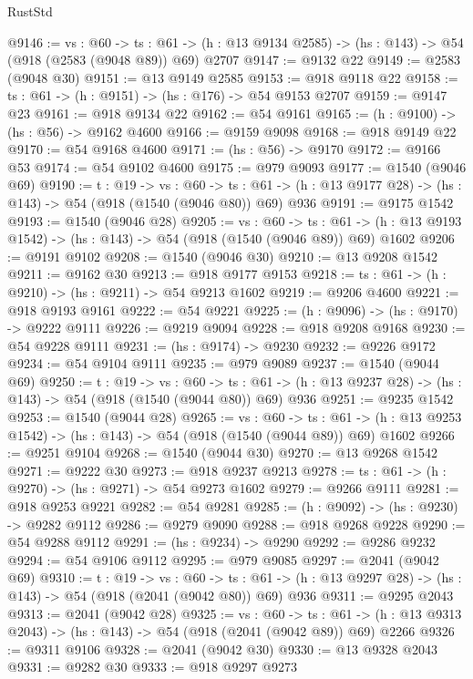 \begin{lexlean}{RustStd}
\begin{coremodule}
@9146 := {vs : @60} ->
  {ts : @61} -> (h : @13 @9134 @2585) -> (hs : @143) -> @54 (@918 (@2583 (@9048 @89)) @69) @2707
@9147 := @9132 @22
@9149 := @2583 (@9048 @30)
@9151 := @13 @9149 @2585
@9153 := @918 @9118 @22
@9158 := {ts : @61} -> (h : @9151) -> (hs : @176) -> @54 @9153 @2707
@9159 := @9147 @23
@9161 := @918 @9134 @22
@9162 := @54 @9161
@9165 := (h : @9100) -> (hs : @56) -> @9162 @4600
@9166 := @9159 @9098
@9168 := @918 @9149 @22
@9170 := @54 @9168 @4600
@9171 := (hs : @56) -> @9170
@9172 := @9166 @53
@9174 := @54 @9102 @4600
@9175 := @979 @9093
@9177 := @1540 (@9046 @69)
@9190 := {t : @19} ->
  {vs : @60} ->
  {ts : @61} -> (h : @13 @9177 @28) -> (hs : @143) -> @54 (@918 (@1540 (@9046 @80)) @69) @936
@9191 := @9175 @1542
@9193 := @1540 (@9046 @28)
@9205 := {vs : @60} ->
  {ts : @61} -> (h : @13 @9193 @1542) -> (hs : @143) -> @54 (@918 (@1540 (@9046 @89)) @69) @1602
@9206 := @9191 @9102
@9208 := @1540 (@9046 @30)
@9210 := @13 @9208 @1542
@9211 := @9162 @30
@9213 := @918 @9177 @9153
@9218 := {ts : @61} -> (h : @9210) -> (hs : @9211) -> @54 @9213 @1602
@9219 := @9206 @4600
@9221 := @918 @9193 @9161
@9222 := @54 @9221
@9225 := (h : @9096) -> (hs : @9170) -> @9222 @9111
@9226 := @9219 @9094
@9228 := @918 @9208 @9168
@9230 := @54 @9228 @9111
@9231 := (hs : @9174) -> @9230
@9232 := @9226 @9172
@9234 := @54 @9104 @9111
@9235 := @979 @9089
@9237 := @1540 (@9044 @69)
@9250 := {t : @19} ->
  {vs : @60} ->
  {ts : @61} -> (h : @13 @9237 @28) -> (hs : @143) -> @54 (@918 (@1540 (@9044 @80)) @69) @936
@9251 := @9235 @1542
@9253 := @1540 (@9044 @28)
@9265 := {vs : @60} ->
  {ts : @61} -> (h : @13 @9253 @1542) -> (hs : @143) -> @54 (@918 (@1540 (@9044 @89)) @69) @1602
@9266 := @9251 @9104
@9268 := @1540 (@9044 @30)
@9270 := @13 @9268 @1542
@9271 := @9222 @30
@9273 := @918 @9237 @9213
@9278 := {ts : @61} -> (h : @9270) -> (hs : @9271) -> @54 @9273 @1602
@9279 := @9266 @9111
@9281 := @918 @9253 @9221
@9282 := @54 @9281
@9285 := (h : @9092) -> (hs : @9230) -> @9282 @9112
@9286 := @9279 @9090
@9288 := @918 @9268 @9228
@9290 := @54 @9288 @9112
@9291 := (hs : @9234) -> @9290
@9292 := @9286 @9232
@9294 := @54 @9106 @9112
@9295 := @979 @9085
@9297 := @2041 (@9042 @69)
@9310 := {t : @19} ->
  {vs : @60} ->
  {ts : @61} -> (h : @13 @9297 @28) -> (hs : @143) -> @54 (@918 (@2041 (@9042 @80)) @69) @936
@9311 := @9295 @2043
@9313 := @2041 (@9042 @28)
@9325 := {vs : @60} ->
  {ts : @61} -> (h : @13 @9313 @2043) -> (hs : @143) -> @54 (@918 (@2041 (@9042 @89)) @69) @2266
@9326 := @9311 @9106
@9328 := @2041 (@9042 @30)
@9330 := @13 @9328 @2043
@9331 := @9282 @30
@9333 := @918 @9297 @9273

\end{coremodule}
\end{lexlean}
